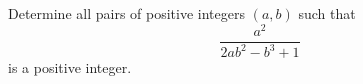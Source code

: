 Determine all pairs of positive integers $(a,b)$ such that  \[ \dfrac{a^2}{2ab^2-b^3+1}  \]  is a positive integer.
